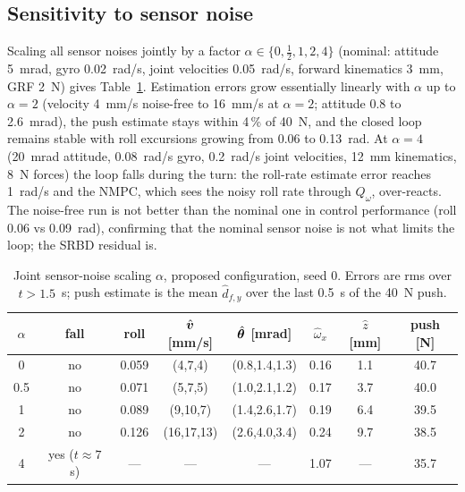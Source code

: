 \documentclass[11pt]{article}
\begin{document}
\subsection{Sensitivity to sensor noise}
Scaling all sensor noises jointly by a factor $\alpha\in\{0,\tfrac12,1,2,4\}$ (nominal: attitude 5~mrad, gyro 0.02~rad/s, joint velocities 0.05~rad/s, forward kinematics 3~mm, GRF 2~N) gives Table~\ref{tab:noise}. Estimation errors grow essentially linearly with $\alpha$ up to $\alpha=2$ (velocity 4~mm/s noise-free to 16~mm/s at $\alpha=2$; attitude 0.8 to 2.6~mrad), the push estimate stays within 4\,\% of 40~N, and the closed loop remains stable with roll excursions growing from 0.06 to 0.13~rad. At $\alpha=4$ (20~mrad attitude, 0.08~rad/s gyro, 0.2~rad/s joint velocities, 12~mm kinematics, 8~N forces) the loop falls during the turn: the roll-rate estimate error reaches 1~rad/s and the NMPC, which sees the noisy roll rate through $Q_\omega$, over-reacts. The noise-free run is not better than the nominal one in control performance (roll 0.06 vs 0.09~rad), confirming that the nominal sensor noise is not what limits the loop; the SRBD residual is.

\begin{table}[t]\centering\caption{Joint sensor-noise scaling $\alpha$, proposed configuration, seed 0. Errors are rms over $t>1.5$~s; push estimate is the mean $\hat d_{f,y}$ over the last 0.5~s of the 40~N push.}\label{tab:noise}
\scriptsize\setlength\tabcolsep{3pt}\begin{tabular}{@{}cccccccc@{}}\toprule
$\alpha$ & fall & roll & $\hat{\bm{v}}$ [mm/s] & $\hat{\bm{\theta}}$ [mrad] & $\hat\omega_x$ & $\hat z$ [mm] & push [N]\\\midrule
0 & no & 0.059 & (4,7,4) & (0.8,1.4,1.3) & 0.16 & 1.1 & 40.7\\
0.5 & no & 0.071 & (5,7,5) & (1.0,2.1,1.2) & 0.17 & 3.7 & 40.0\\
1 & no & 0.089 & (9,10,7) & (1.4,2.6,1.7) & 0.19 & 6.4 & 39.5\\
2 & no & 0.126 & (16,17,13) & (2.6,4.0,3.4) & 0.24 & 9.7 & 38.5\\
4 & yes ($t\approx7$ s) & --- & --- & --- & 1.07 & --- & 35.7\\
\bottomrule\end{tabular}\end{table}
\end{document}
